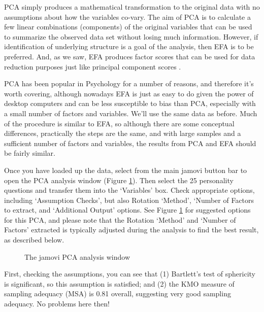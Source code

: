 PCA simply produces a mathematical transformation to the original data with no assumptions about how the variables co-vary. The aim of PCA is to calculate a few linear combinations (components) of the original variables that can be used to summarize the observed data set without losing much information. However, if identification of underlying structure is a goal of the analysis, then EFA is to be preferred. And, as we saw, EFA produces factor scores that can be used for data reduction purposes just like principal component scores \parencite{Fabrigar1999}.

PCA has been popular in Psychology for a number of reasons, and therefore it's worth covering, although nowadays EFA is just as easy to do given the power of desktop computers and can be less susceptible to bias than PCA, especially with a small number of factors and variables. We'll use the same  data as before. Much of the procedure is similar to EFA, so although there are some conceptual differences, practically the steps are the same, and with large samples and a sufficient number of factors and variables, the results from PCA and EFA should be fairly similar. 


Once you have loaded up the  data, select  from the main jamovi button bar to open the PCA analysis window (Figure \ref{fig:pca1}). Then select the 25 personality questions and transfer them into the ‘Variables’ box. Check appropriate options, including ‘Assumption Checks’, but also Rotation ‘Method’, ‘Number of Factors to extract, and ‘Additional Output’ options. See Figure \ref{fig:pca1} for suggested options for this  PCA, and please note that the Rotation ‘Method’ and ‘Number of Factors’ extracted is typically adjusted during the analysis to find the best result, as described below.

\begin{figure}[!htb]
\begin{center}
\caption{The jamovi PCA analysis window}
\label{fig:pca1}
\HR
\end{center}
\end{figure}

First, checking the assumptions, you can see that (1) Bartlett’s test of sphericity is significant, so this assumption is satisfied; and (2) the KMO measure of sampling adequacy (MSA) is 0.81 overall, suggesting very good sampling adequacy. No problems here then! 

